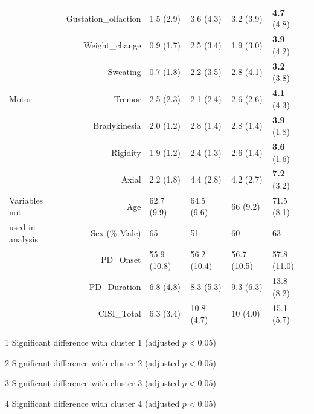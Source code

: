 \documentclass[preprint,5p]{elsarticle} %
\begin{document}
\begin{table}[t]
\begin{threeparttable}
\begin{tabular}{lrllll}
  &Gustation\_olfaction & 1.5 (2.9)\tnote{234} & 3.6 (4.3)\tnote{1} & 3.2 (3.9)\tnote{14} &
  \textbf{4.7} (4.8)\tnote{13} \\
  &Weight\_change & 0.9 (1.7)\tnote{234} & 2.5 (3.4)\tnote{14} & 1.9 (3.0)\tnote{14} & \textbf{3.9} (4.2)\tnote{123} \\
  &Sweating & 0.7 (1.8)\tnote{234} & 2.2 (3.5)\tnote{1} & 2.8 (4.1)\tnote{1} & \textbf{3.2}
  (3.8)\tnote{1} \\
  \midrule
  Motor &
  Tremor & 2.5 (2.3) & 2.1 (2.4) & 2.6 (2.6) & \textbf{4.1} (4.3) \\
  &Bradykinesia & 2.0 (1.2)\tnote{234} & 2.8 (1.4)\tnote{14} & 2.8 (1.4)\tnote{14} & \textbf{3.9} (1.8)\tnote{123} \\
  &Rigidity & 1.9 (1.2)\tnote{234} & 2.4 (1.3)\tnote{14} & 2.6 (1.4)\tnote{14} & \textbf{3.6} (1.6)\tnote{123} \\
  &Axial & 2.2 (1.8)\tnote{234} & 4.4 (2.8)\tnote{14} & 4.2 (2.7)\tnote{14} & \textbf{7.2} (3.2)\tnote{123} \\
  \midrule
  Variables not & Age & 62.7 (9.9)\tnote{34} & 64.5 (9.6)\tnote{4} & 66 (9.2)\tnote{14} & 71.5
  (8.1)\tnote{123} \\
  used in analysis & Sex (\% Male) & 65\tnote{2} & 51\tnote{1} & 60 & 63 \\
  & PD\_Onset & 55.9 (10.8) & 56.2 (10.4) & 56.7 (10.5) & 57.8 (11.0) \\
  & PD\_Duration & 6.8 (4.8)\tnote{34} & 8.3 (5.3)\tnote{4} & 9.3 (6.3)\tnote{14} & 13.8
  (8.2)\tnote{123} \\
  & CISI\_Total & 6.3 (3.4)\tnote{234} & 10.8 (4.7)\tnote{14} & 10 (4.0)\tnote{14} & 15.1 (5.7)\tnote{123} \\
   \bottomrule
\end{tabular}
  \begin{tablenotes}
    \small
    \item[1] Significant difference with cluster 1 (adjusted $p < 0.05$)
    \item[2] Significant difference with cluster 2 (adjusted $p < 0.05$)
    \item[3] Significant difference with cluster 3 (adjusted $p < 0.05$)
    \item[4] Significant difference with cluster 4 (adjusted $p < 0.05$)
  \end{tablenotes}
  \end{threeparttable}
\end{table}
\end{document}
